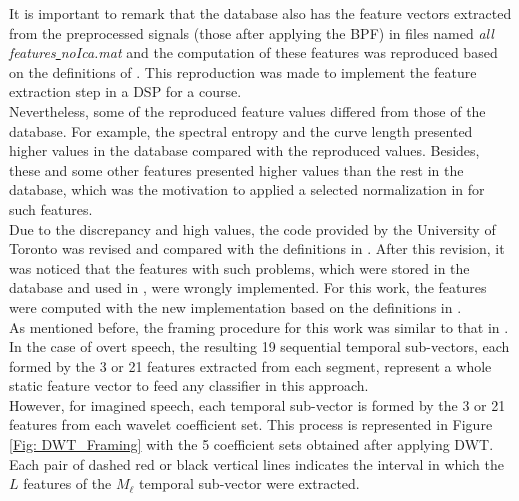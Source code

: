 It is important to remark that the database also has the feature vectors extracted from the preprocessed signals (those after applying the BPF) in files named \textit{all\underline{ }features\underline{ }noIca.mat} and the computation of these features was reproduced based on the definitions of \cite{d2003epileptic}. This reproduction was made to implement the feature extraction step in a DSP for a course.\\

Nevertheless, some of the reproduced feature values differed from those of the database. For example, the spectral entropy and the curve length presented higher values in the database compared with the reproduced values. Besides, these and some other features presented higher values than the rest in the database, which was the motivation to applied a selected normalization in \cite{yazaed} for such features.\\

Due to the discrepancy and high values, the code provided by the University of Toronto was revised and compared with the definitions in \cite{d2003epileptic}. After this revision, it was noticed that the features with such problems, which were stored in the database and used in \cite{zhao2015classifying,zhao2013combining,yazaed}, were wrongly implemented. For this work, the features were computed with the new implementation based on the definitions in \cite{d2003epileptic}.\\

As mentioned before, the framing procedure for this work was similar to that in \cite{zhao2015classifying}. In the case of overt speech, the resulting 19 sequential temporal sub-vectors, each formed by the 3 or 21 features extracted from each segment, represent a whole static feature vector to feed any classifier in this approach.\\

However, for imagined speech, each temporal sub-vector is formed by the 3 or 21 features from each wavelet coefficient set. This process is represented in Figure \ref{Fig: DWT_Framing} with the 5 coefficient sets obtained after applying DWT. Each pair of dashed red or black vertical lines indicates the interval in which the $ L $ features of the $ M_{\ell} $ temporal sub-vector were extracted.\\

